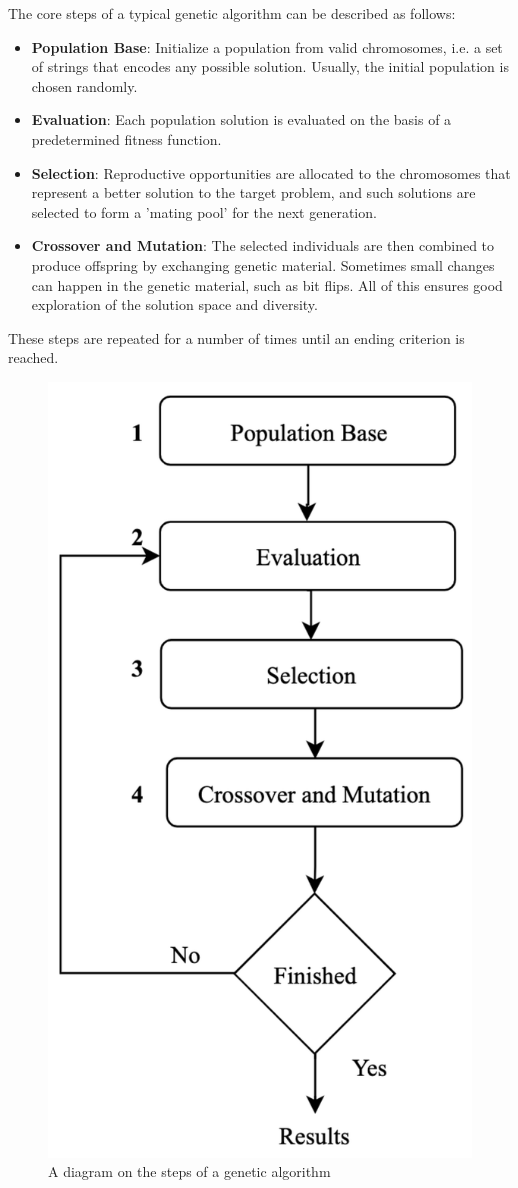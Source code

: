 \documentclass[sigconf]{acmart} %
\begin{document}
The core steps of a typical genetic algorithm can be described as follows:
\begin{itemize}
    \item \textbf{Population Base}: Initialize a population from valid chromosomes, i.e. a set of strings that encodes any possible solution. Usually, the initial population is chosen randomly.
    \item \textbf{Evaluation}: Each population solution is evaluated on the basis of a predetermined fitness function.
    \item \textbf{Selection}: Reproductive opportunities are allocated to the chromosomes that represent a better solution to the target problem, and such solutions are selected to form a 'mating pool' for the next generation.
    \item \textbf{Crossover and Mutation}: The selected individuals are then combined to produce offspring by exchanging genetic material. Sometimes small changes can happen in the genetic material, such as bit flips. All of this ensures good exploration of the solution space and diversity.
    
\end{itemize}
These steps are repeated for a number of times until an ending criterion is reached.
\begin{figure}
\centering
\includegraphics[width = 0.5\linewidth]{pictures/Steps-of-Genetic-Algorithms.png}
\caption{\label{fig:Steps-of-Genetic-Algorithm}A diagram on the steps of a genetic algorithm}
\end{figure}
\end{document}
